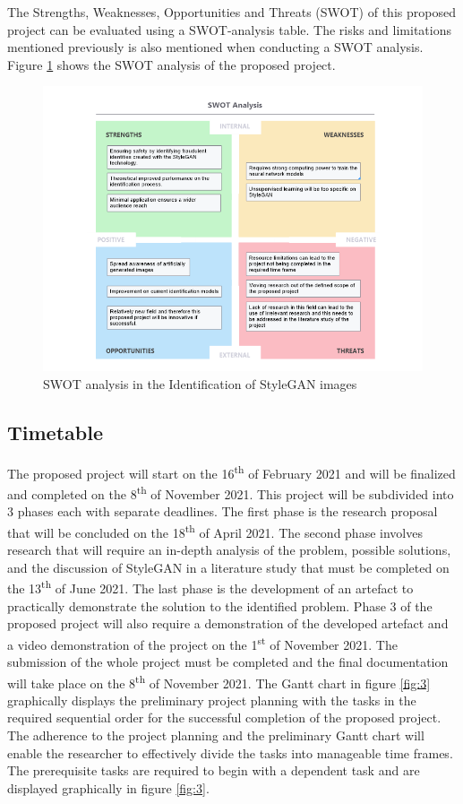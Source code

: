 The Strengths, Weaknesses, Opportunities and Threats (SWOT) of this proposed project can be evaluated using a SWOT-analysis table. The risks and limitations mentioned previously is also mentioned when conducting a SWOT analysis. Figure \ref{fig:2} shows the SWOT analysis of the proposed project.

\begin{figure}[H]%
\centering
\includegraphics[width=1\textwidth]{img/SWOT.png}
\caption{SWOT analysis in the Identification of StyleGAN images}%
\label{fig:2}%
\end{figure}

\subsection{Timetable}

The proposed project will start on the 16\textsuperscript{th} of February 2021 and will be finalized and completed on the 8\textsuperscript{th} of November 2021. This project will be subdivided into 3 phases each with separate deadlines. The first phase is the research proposal that will be concluded on the 18\textsuperscript{th} of April 2021. The second phase involves research that will require an in-depth analysis of the problem, possible solutions, and the discussion of StyleGAN in a literature study that must be completed on the 13\textsuperscript{th} of June 2021. The last phase is the development of an artefact to practically demonstrate the solution to the identified problem. Phase 3 of the proposed project will also require a demonstration of the developed artefact and a video demonstration of the project on the 1\textsuperscript{st} of November 2021. The submission of the whole project must be completed and the final documentation will take place on the 8\textsuperscript{th} of November 2021. The Gantt chart in figure \ref{fig:3} graphically displays the preliminary project planning with the tasks in the required sequential order for the successful completion of the proposed project. The adherence to the project planning and the preliminary Gantt chart will enable the researcher to effectively divide the tasks into manageable time frames. The prerequisite tasks are required to begin with a dependent task and are displayed graphically in figure \ref{fig:3}.

